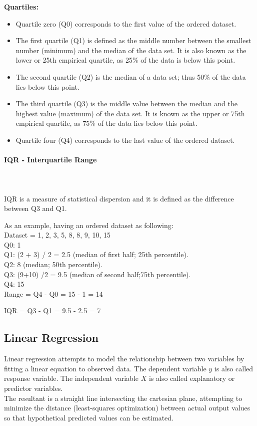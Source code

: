 \documentclass{article}
\begin{document}
\textbf{Quartiles:}
\begin{itemize}
    \item Quartile zero (Q0) corresponds to the first value of the ordered dataset.
    \item The first quartile (Q1) is defined as the middle number between the smallest number (minimum) and the median of the data set. It is also known as the lower or 25th empirical quartile, as 25\% of the data is below this point.
    \item The second quartile (Q2) is the median of a data set; thus 50\% of the data lies below this point.
    \item The third quartile (Q3) is the middle value between the median and the highest value (maximum) of the data set. It is known as the upper or 75th empirical quartile, as 75\% of the data lies below this point.
    \item Quartile four (Q4) corresponds to the last value of the ordered dataset.
\end{itemize}

\paragraph{IQR - Interquartile Range}\mbox{} \\
\mbox{} \\
IQR is a measure of statistical dispersion and it is defined as the difference between Q3 and Q1.

As an example, having an ordered dataset as following:\\
Dataset = 1, 2, 3, 5, 8, 8, 9, 10, 15\\
Q0: 1\\
Q1: (2 + 3) / 2 = 2.5 (median of first half; 25th percentile).\\
Q2: 8 (median; 50th percentile).\\
Q3: (9+10)  /2 = 9.5 (median of second half;75th percentile).\\
Q4: 15\\

Range = Q4 - Q0 = 15 - 1 = 14

IQR = Q3 - Q1 = 9.5 - 2.5 = 7

\subsection{Linear Regression}
Linear regression attempts to model the relationship between two variables by fitting a linear equation to observed data. The dependent variable $y$ is also called response variable. The independent variable $X$ is also called explanatory or predictor variables. \\
The resultant is a straight line intersecting the cartesian plane, attempting to minimize the distance (least-squares optimization) between actual output values so that hypothetical predicted values can be estimated.
\end{document}
